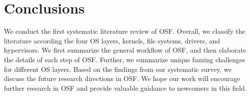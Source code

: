 
\section{Conclusions}\label{Section8}

We conduct the first systematic literature review of OSF. Overall, we classify the literature according the four OS layers, \ie kernels, file systems, drivers, and hypervisors. We first summarize the general workflow of OSF, and then elaborate the details of each step of OSF. Further, we summarize unique fuzzing challenges for different OS layers. Based on the findings from our systematic survey, we discuss the future research directions in OSF. We hope our work will encourage further research in OSF and provide valuable guidance to newcomers in this field.



